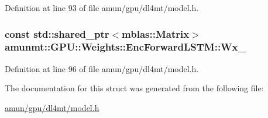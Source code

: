 Definition at line 93 of file amun/gpu/dl4mt/model.\+h.

\subsubsection[{\texorpdfstring{Wx\+\_\+}{Wx_}}]{\setlength{\rightskip}{0pt plus 5cm}const std\+::shared\+\_\+ptr$<${\bf mblas\+::\+Matrix}$>$ amunmt\+::\+G\+P\+U\+::\+Weights\+::\+Enc\+Forward\+L\+S\+T\+M\+::\+Wx\+\_\+}\hypertarget{structamunmt_1_1GPU_1_1Weights_1_1EncForwardLSTM_acc24fe4656b768fb6368165cb0922e5e}{}\label{structamunmt_1_1GPU_1_1Weights_1_1EncForwardLSTM_acc24fe4656b768fb6368165cb0922e5e}


Definition at line 96 of file amun/gpu/dl4mt/model.\+h.



The documentation for this struct was generated from the following file\+:\begin{DoxyCompactItemize}
\item 
\hyperlink{amun_2gpu_2dl4mt_2model_8h}{amun/gpu/dl4mt/model.\+h}\end{DoxyCompactItemize}
